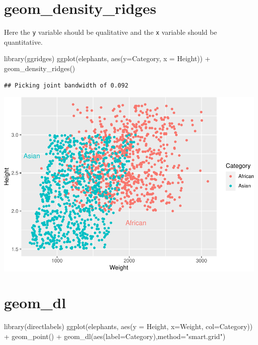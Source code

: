 \documentclass[
]{book}
\newenvironment{Shaded}{\begin{snugshade}}{\end{snugshade}}
\newcommand{\AttributeTok}[1]{\textcolor[rgb]{0.77,0.63,0.00}{#1}}
\newcommand{\FunctionTok}[1]{\textcolor[rgb]{0.00,0.00,0.00}{#1}}
\newcommand{\NormalTok}[1]{#1}
\newcommand{\SpecialCharTok}[1]{\textcolor[rgb]{0.00,0.00,0.00}{#1}}
\newcommand{\StringTok}[1]{\textcolor[rgb]{0.31,0.60,0.02}{#1}}
\begin{document}
\hypertarget{geom_density_ridges}{%
\section{geom\_density\_ridges}\label{geom_density_ridges}}

Here the \texttt{y} variable should be qualitative and the \texttt{x} variable should be quantitative.

\begin{Shaded}
\begin{Highlighting}[]
\FunctionTok{library}\NormalTok{(ggridges)}
\FunctionTok{ggplot}\NormalTok{(elephants, }\FunctionTok{aes}\NormalTok{(}\AttributeTok{y=}\NormalTok{Category, }\AttributeTok{x =}\NormalTok{ Height)) }\SpecialCharTok{+} 
    \FunctionTok{geom\_density\_ridges}\NormalTok{()}
\end{Highlighting}
\end{Shaded}

\begin{verbatim}
## Picking joint bandwidth of 0.092
\end{verbatim}

\includegraphics{Data-Visualisation-geom-Encyclopedia_files/figure-latex/unnamed-chunk-35-1.pdf}

\hypertarget{geom_dl}{%
\section{geom\_dl}\label{geom_dl}}

\begin{Shaded}
\begin{Highlighting}[]
\FunctionTok{library}\NormalTok{(directlabels)}
\FunctionTok{ggplot}\NormalTok{(elephants, }\FunctionTok{aes}\NormalTok{(}\AttributeTok{y =}\NormalTok{ Height, }\AttributeTok{x=}\NormalTok{Weight, }\AttributeTok{col=}\NormalTok{Category)) }\SpecialCharTok{+} 
  \FunctionTok{geom\_point}\NormalTok{() }\SpecialCharTok{+}
  \FunctionTok{geom\_dl}\NormalTok{(}\FunctionTok{aes}\NormalTok{(}\AttributeTok{label=}\NormalTok{Category),}\AttributeTok{method=}\StringTok{"smart.grid"}\NormalTok{)}
\end{Highlighting}
\end{Shaded}
\end{document}
